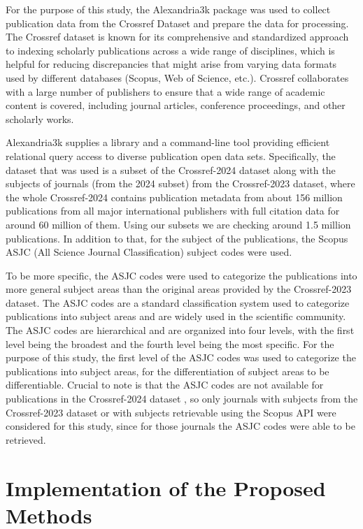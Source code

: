 For the purpose of this study, the Alexandria3k \cite{Spi23g} package was used
to collect publication data from the Crossref Dataset \cite{Crossref2020} and
prepare the data for processing. The Crossref dataset is known for its
comprehensive and standardized approach to indexing scholarly publications
across a wide range of disciplines, which is helpful for reducing discrepancies
that might arise from varying data formats used by different databases (Scopus,
Web of Science, etc.). Crossref collaborates with a large number of publishers
to ensure that a wide range of academic content is covered, including journal
articles, conference proceedings, and other scholarly works.

Alexandria3k supplies a library and a command-line tool providing efficient
relational query access to diverse publication open data sets. Specifically,
the dataset that was used is a subset of the Crossref-2024 dataset along with
the subjects of journals (from the 2024 subset) from the Crossref-2023 dataset,
where the whole Crossref-2024 contains publication metadata from about 156
million publications from all major international publishers with full citation
data for around 60 million of them. Using our subsets we are checking around
1.5 million publications. In addition to that, for the subject of the
publications, the Scopus ASJC (All Science Journal Classification) subject
codes were used.

To be more specific, the ASJC codes were used to categorize the publications
into more general subject areas than the original areas provided by the
Crossref-2023 dataset. The ASJC codes are a standard classification system used
to categorize publications into subject areas and are widely used in the
scientific community. The ASJC codes are hierarchical and are organized into
four levels, with the first level being the broadest and the fourth level being
the most specific. For the purpose of this study, the first level of the ASJC
codes was used to categorize the publications into subject areas, for the
differentiation of subject areas to be differentiable. Crucial to note is that
the ASJC codes are not available for publications in the Crossref-2024 dataset
\cite{crossrefSubjectCodes2024}, so only journals with subjects from the
Crossref-2023 dataset or with subjects retrievable using the Scopus API were
considered for this study, since for those journals the ASJC codes were able to
be retrieved.

\section{Implementation of the Proposed Methods}

